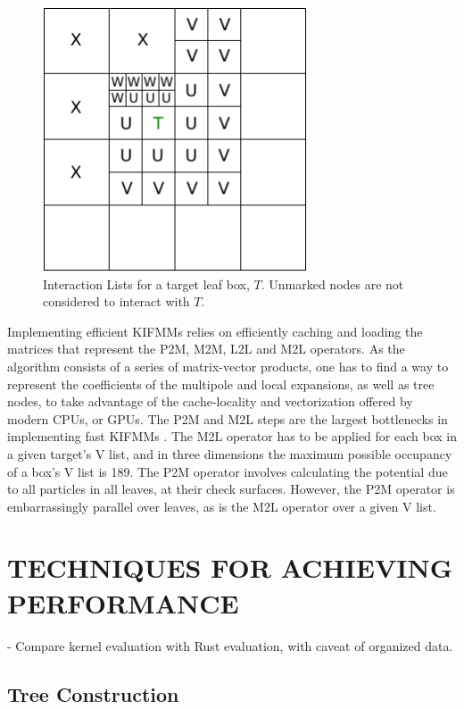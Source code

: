 \documentclass{IEEEcsmag}
\begin{document}
\begin{figure}
\centerline{\includegraphics[width=18.5pc]{figures/interaction_lists.pdf}}
\caption{Interaction Lists for a target leaf box, $T$. Unmarked nodes are not considered to interact with $T$.}
\label{fig:interaction_lists}
\end{figure}

Implementing efficient KIFMMs relies on efficiently caching and loading the matrices that represent the P2M, M2M, L2L and M2L operators. As the algorithm consists of a series of matrix-vector products, one has to find a way to represent the coefficients of the multipole and local expansions, as well as tree nodes, to take advantage of the cache-locality and vectorization offered by modern CPUs, or GPUs. The P2M and M2L steps are the largest bottlenecks in implementing fast KIFMMs \cite{Lashuk2012}. The M2L operator has to be applied for each box in a given target's V list, and in three dimensions the maximum possible occupancy of a box's V list is 189. The P2M operator involves calculating the potential due to all particles in all leaves, at their check surfaces. However, the P2M operator is embarrassingly parallel over leaves, as is the M2L operator over a given V list.

\section{TECHNIQUES FOR ACHIEVING PERFORMANCE}

- Compare kernel evaluation with Rust evaluation, with caveat of organized data.

\subsection{Tree Construction}
\end{document}
